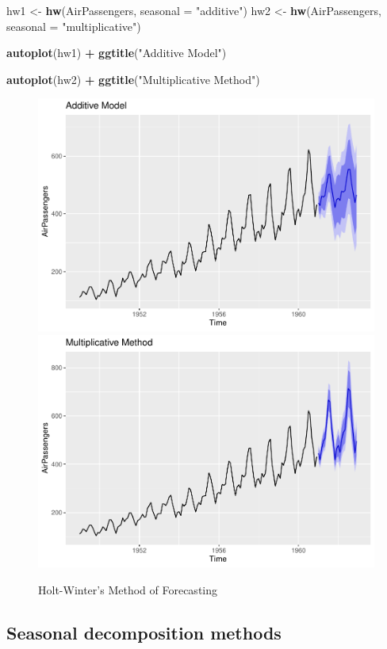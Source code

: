 \documentclass[
]{book}
\newenvironment{Shaded}{\begin{snugshade}}{\end{snugshade}}
\newcommand{\AttributeTok}[1]{\textcolor[rgb]{0.13,0.29,0.53}{#1}}
\newcommand{\FunctionTok}[1]{\textcolor[rgb]{0.13,0.29,0.53}{\textbf{#1}}}
\newcommand{\NormalTok}[1]{#1}
\newcommand{\OtherTok}[1]{\textcolor[rgb]{0.56,0.35,0.01}{#1}}
\newcommand{\SpecialCharTok}[1]{\textcolor[rgb]{0.81,0.36,0.00}{\textbf{#1}}}
\newcommand{\StringTok}[1]{\textcolor[rgb]{0.31,0.60,0.02}{#1}}
\begin{document}
\begin{Shaded}
\begin{Highlighting}[]
\NormalTok{hw1 }\OtherTok{\textless{}{-}} \FunctionTok{hw}\NormalTok{(AirPassengers, }\AttributeTok{seasonal =} \StringTok{"additive"}\NormalTok{)}
\NormalTok{hw2 }\OtherTok{\textless{}{-}} \FunctionTok{hw}\NormalTok{(AirPassengers, }\AttributeTok{seasonal =} \StringTok{"multiplicative"}\NormalTok{)}


\FunctionTok{autoplot}\NormalTok{(hw1) }\SpecialCharTok{+}
  \FunctionTok{ggtitle}\NormalTok{(}\StringTok{"Additive Model"}\NormalTok{)}

\FunctionTok{autoplot}\NormalTok{(hw2) }\SpecialCharTok{+}
  \FunctionTok{ggtitle}\NormalTok{(}\StringTok{"Multiplicative Method"}\NormalTok{)}
\end{Highlighting}
\end{Shaded}

\begin{figure}

{\centering \includegraphics[width=0.48\linewidth]{DauR_files/figure-latex/hw1-1} \includegraphics[width=0.48\linewidth]{DauR_files/figure-latex/hw1-2} 

}

\caption{Holt-Winter's Method of Forecasting}\label{fig:hw1}
\end{figure}

\hypertarget{seasonal-decomposition-methods}{%
\subsection*{Seasonal decomposition methods}\label{seasonal-decomposition-methods}}
\end{document}
